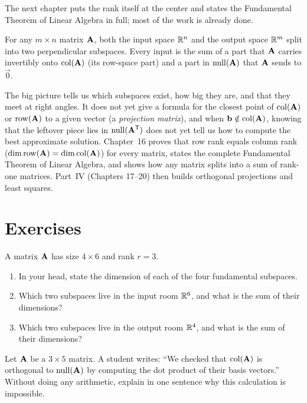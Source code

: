 The next chapter puts the rank itself at the center and states the
Fundamental Theorem of Linear Algebra in full; most of the work is already done.

\begin{connectionbox}
For any $m\times n$ matrix $\mathbf{A}$, both the input space $\mathbb{R}^n$ and the output space $\mathbb{R}^m$ split into two perpendicular subspaces. Every input is the sum of a part that $\mathbf{A}$ carries invertibly onto $\operatorname{col}(\mathbf{A})$ (its row-space part) and a part in $\operatorname{null}(\mathbf{A})$ that $\mathbf{A}$ sends to $\vec{0}$.

The big picture tells us which subspaces exist, how big they are, and that they meet at right angles. It does not yet give a formula for the closest point of $\operatorname{col}(\mathbf{A})$ or $\operatorname{row}(\mathbf{A})$ to a given vector (a \emph{projection matrix}), and when $\mathbf{b} \notin \operatorname{col}(\mathbf{A})$, knowing that the leftover piece lies in $\operatorname{null}(\mathbf{A}^{\mathsf{T}})$ does not yet tell us how to compute the best approximate solution. Chapter~16 proves that row rank equals column rank ($\operatorname{dim} \operatorname{row}(\mathbf{A}) = \operatorname{dim} \operatorname{col}(\mathbf{A})$) for every matrix, states the complete Fundamental Theorem of Linear Algebra, and shows how any matrix splits into a sum of rank-one matrices. Part~IV (Chapters 17--20) then builds orthogonal projections and least squares.
\end{connectionbox}

\section{Exercises}

\begin{exercise}\label{ch15:ex-mental-dim}
A matrix $\mathbf{A}$ has size $4 \times 6$ and rank $r = 3$.
\begin{enumerate}[label=(\alph*)]
  \item In your head, state the dimension of each of the four fundamental subspaces.
  \item Which two subspaces live in the input room $\mathbb{R}^6$, and what is the sum of their dimensions?
  \item Which two subspaces live in the output room $\mathbb{R}^4$, and what is the sum of their dimensions?
\end{enumerate}
\end{exercise}

\begin{exercise}\label{ch15:ex-mental-room}
Let $\mathbf{A}$ be a $3 \times 5$ matrix. A student writes: ``We checked that $\operatorname{col}(\mathbf{A})$ is
orthogonal to $\operatorname{null}(\mathbf{A})$ by computing the dot product of their basis vectors.''
Without doing any arithmetic, explain in one sentence why this calculation is impossible.
\end{exercise}

